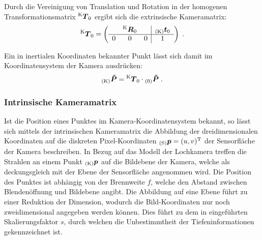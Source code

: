 Durch die Vereinigung von Translation und Rotation in der homogenen Transformationsmatrix $\tmat{K}{0}$ ergibt sich die extrinsische Kameramatrix:
%
\begin{equation}
\tmat{K}{0} = 
\mat{ccc|c}{
  & \rmat{K}{0} &   & \ve{K}{t}_\ind{0} \\
\hline
0 &      0      & 0 & 1 \\
} \; \text{.}
\end{equation}


Ein in inertialen Koordinaten bekannter Punkt lässt sich damit im Koordinatensystem der Kamera ausdrücken:
%
\begin{equation}
\ve{K}{\tilde{P}} = \tmat{K}{0} \cdot \ve{0}{\tilde{P}} \; \text{.}
\end{equation}


\subsubsection{Intrinsische Kameramatrix}
Ist die Position eines Punktes im Kamera-Koordinatensystem bekannt, so lässt sich mittels der intrinsischen Kameramatrix die Abbildung der dreidimensionalen Koordinaten auf die diskreten Pixel-Koordinaten $\ve{S}{p} = (u,v)^\transpose$ der Sensorfläche der Kamera beschreiben. In Bezug auf das Modell der Lochkamera treffen die Strahlen an einem Punkt $\ve{K}{{p}}$ auf die Bildebene der Kamera, welche als deckungsgleich mit der Ebene der Sensorfläche angenommen wird. Die Position des Punktes ist abhängig von der Brennweite $f$, welche den Abstand zwischen Blendenöffnung und Bildebene angibt. Die Abbildung auf eine Ebene führt zu einer Reduktion der Dimension, wodurch die Bild-Koordinaten nur noch zweidimensional angegeben werden können. Dies führt zu dem in  eingeführten Skalierungsfaktor $s$, durch welchen die Unbestimmtheit der Tiefeninformationen gekennzeichnet ist.\\
\prever{
}

\prever{
}

